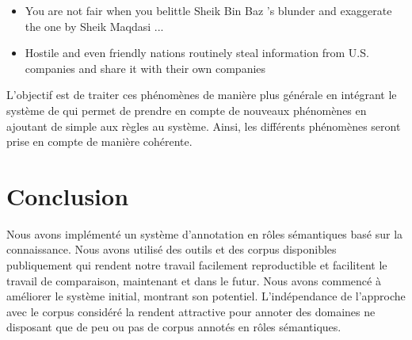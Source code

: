 \begin{itemize}
    \item You are not fair when you belittle Sheik Bin Baz 's blunder and
          exaggerate the one by Sheik Maqdasi ...
    \item Hostile and even friendly nations routinely steal information from
          U.S. companies and share it with their own companies
\end{itemize}

L'objectif est de traiter ces phénomènes de manière plus générale en intégrant
le système de \cite{ribeyre2013systeme} qui permet de prendre en compte de
nouveaux phénomènes en ajoutant de simple aux règles au système. Ainsi, les
différents phénomènes seront prise en compte de manière cohérente.

\section{Conclusion}

Nous avons implémenté un système d'annotation en rôles sémantiques basé sur la
connaissance. Nous avons utilisé des outils et des corpus disponibles
publiquement qui rendent notre travail facilement reproductible et facilitent
le travail de comparaison, maintenant et dans le futur. Nous avons commencé à
améliorer le système initial, montrant son potentiel. L'indépendance de
l'approche avec le corpus considéré la rendent attractive pour annoter des
domaines ne disposant que de peu ou pas de corpus annotés en rôles sémantiques.
